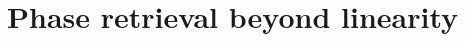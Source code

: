 \documentclass[
twoside,
openright,
titlepage,
numbers=noenddot,
headinclude,
fleqn,
a4paper,
footinclude=true,
cleardoublepage=empty,
abstractoff,
BCOR=5mm,
paper=a4,
fontsize=11pt,
british,ngerman,american,
]{scrreprt}
\begin{document}




\chapter{Phase retrieval beyond linearity}
\label{cha:beyond}



\end{document}
